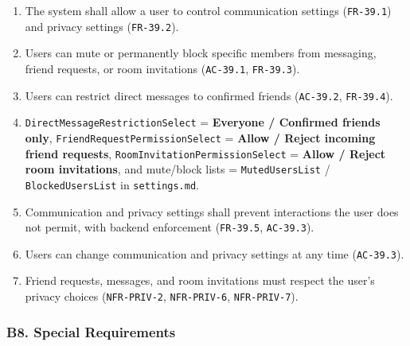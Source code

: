 \documentclass[12pt]{article}
\begin{document}
\begin{enumerate}
\item The system shall allow a user to control communication settings (\texttt{FR-39.1}) and privacy settings (\texttt{FR-39.2}).
\item Users can mute or permanently block specific members from messaging, friend requests, or room invitations (\texttt{AC-39.1}, \texttt{FR-39.3}).
\item Users can restrict direct messages to confirmed friends (\texttt{AC-39.2}, \texttt{FR-39.4}).
\item \texttt{DirectMessageRestrictionSelect} = \textbf{Everyone / Confirmed friends only}, \texttt{FriendRequestPermissionSelect} = \textbf{Allow / Reject incoming friend requests}, \texttt{RoomInvitationPermissionSelect} = \textbf{Allow / Reject room invitations}, and mute/block lists = \texttt{MutedUsersList} / \texttt{BlockedUsersList} in \texttt{settings.md}.
\item Communication and privacy settings shall prevent interactions the user does not permit, with backend enforcement (\texttt{FR-39.5}, \texttt{AC-39.3}).
\item Users can change communication and privacy settings at any time (\texttt{AC-39.3}).
\item Friend requests, messages, and room invitations must respect the user's privacy choices (\texttt{NFR-PRIV-2}, \texttt{NFR-PRIV-6}, \texttt{NFR-PRIV-7}).
\end{enumerate}
\par\medskip

\hypertarget{sec:b8-special-requirements}{}
\subsubsection*{B8. Special Requirements}
\par\medskip
\end{document}
